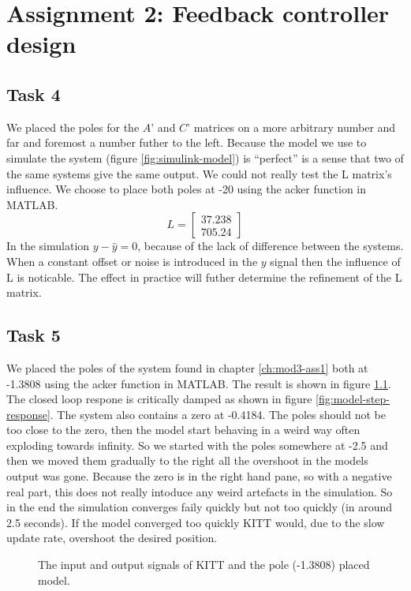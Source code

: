 \documentclass[final]{scrreprt} %
\begin{document}
\chapter{Assignment 2: Feedback controller design}
\label{ch:mod3-ass2}
\section{Task 4}
\label{sec:mod3-tsk4}
We placed the poles for the $A’$ and $C’$ matrices on a more arbitrary number and far and foremost a number futher to the left.
Because the model we use to simulate the system (figure \ref{fig:simulink-model}) is “perfect” is a sense that two of the same systems give the same output.
We could not really test the L matrix’s influence.
We choose to place both poles at -20 using the acker function in MATLAB.
\begin{equation}
L=
\begin{bmatrix}
  37.238 \\
  705.24
 \end{bmatrix}
\end{equation}
In the simulation $y-\hat{y}=0$, because of the lack of difference between the systems.
When a constant offset or noise is introduced in the $y$ signal then the influence of L is noticable.
The effect in practice will futher determine the refinement of the L matrix.
\section{Task 5}
\label{sec:mod3-tsk5}
We placed the poles of the system found in chapter \ref{ch:mod3-ass1} both at -1.3808 using the acker function in MATLAB.
The result is shown in figure \ref{fig:KITT-input-output-model-output-after-pole-placing}.
The closed loop respone is critically damped as shown in figure \ref{fig:model-step-response}.
The system also contains a zero at -0.4184.
The poles should not be too close to the zero, then the model start behaving in a weird way often exploding towards infinity.
So we started with the poles somewhere at -2.5 and then we moved them gradually to the right all the overshoot in the models output was gone.
Because the zero is in the right hand pane, so with a negative real part, this does not really intoduce any weird artefacts in the simulation.
So in the end the simulation converges faily quickly but not too quickly (in around 2.5 seconds).
If the model converged too quickly KITT would, due to the slow update rate, overshoot the desired position.
\begin{figure}[H]
	\centering
    	\setlength\figureheight{4cm}
    	\setlength{}
    	    	
    	\caption{The input and output signals of KITT and the pole (-1.3808) placed model.}
    	\label{fig:KITT-input-output-model-output-after-pole-placing}
\end{figure}
\end{document}
